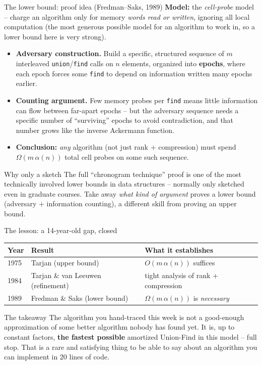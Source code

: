 \documentclass[11pt,aspectratio=169]{beamer}
\begin{document}
\begin{frame}{The lower bound: proof idea (Fredman--Saks, 1989)}
  \small
  \textbf{Model:} the \emph{cell-probe} model -- charge an algorithm only for memory
  \emph{words read or written}, ignoring all local computation (the most generous
  possible model for an algorithm to work in, so a lower bound here is very strong).
  \begin{itemize}
    \item \textbf{Adversary construction.} Build a specific, structured sequence of
    $m$ interleaved \texttt{union}/\texttt{find} calls on $n$ elements, organized into
    \textbf{epochs}, where each epoch forces some \texttt{find} to depend on
    information written many epochs earlier.
    \item \textbf{Counting argument.} Few memory probes per \texttt{find} means little
    information can flow between far-apart epochs -- but the adversary sequence needs
    a specific number of ``surviving'' epochs to avoid contradiction, and that number
    grows like the inverse Ackermann function.
    \item \textbf{Conclusion:} \emph{any} algorithm (not just rank $+$ compression)
    must spend $\Omega(m\,\alpha(n))$ total cell probes on some such sequence.
  \end{itemize}
  \begin{exampleblock}{Why only a sketch}
    The full ``chronogram technique'' proof is one of the most technically involved
    lower bounds in data structures -- normally only sketched even in graduate
    courses. Take away \emph{what kind of argument} proves a lower bound (adversary
    $+$ information counting), a different skill from proving an upper bound.
  \end{exampleblock}
\end{frame}

\begin{frame}{The lesson: a 14-year-old gap, closed}
  \begin{center}
  \begin{tabular}{@{}lll@{}}
    \toprule
    Year & Result & What it establishes \\
    \midrule
    1975 & Tarjan (upper bound) & $O(m\,\alpha(n))$ suffices \\
    1984 & Tarjan \& van Leeuwen (refinement) & tight analysis of rank $+$ compression \\
    1989 & Fredman \& Saks (lower bound) & $\Omega(m\,\alpha(n))$ is \emph{necessary} \\
    \bottomrule
  \end{tabular}
  \end{center}
  \begin{alertblock}{The takeaway}
    The algorithm you hand-traced this week is not a good-enough approximation of some
    better algorithm nobody has found yet. It is, up to constant factors, \textbf{the
    fastest possible} amortized Union-Find in this model -- full stop. That is a rare
    and satisfying thing to be able to say about an algorithm you can implement in 20
    lines of code.
  \end{alertblock}
\end{frame}
\end{document}
